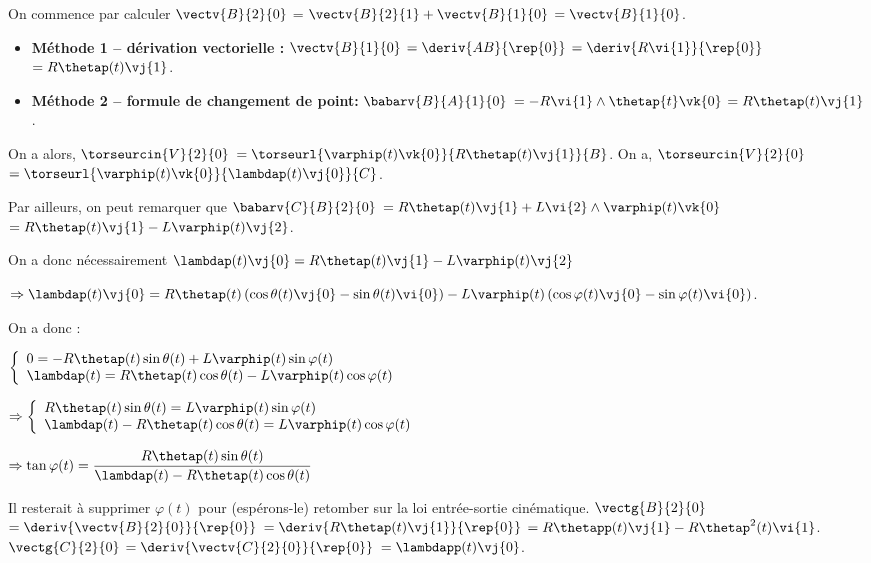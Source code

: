 \begin{corrigebox}
On commence par calculer $\vectv{B}{2}{0}$ = $\vectv{B}{2}{1}+\vectv{B}{1}{0}$ $=\vectv{B}{1}{0}$.
\begin{itemize}
\item \textbf{Méthode 1 -- dérivation vectorielle :}  $\vectv{B}{1}{0}$ $=\deriv{AB}{\rep{0}}$ 
$=\deriv{R\vi{1}}{\rep{0}}$ 
$= R\thetap(t) \vj{1}$. 
\item \textbf{Méthode 2 -- formule de changement de point: }
$\babarv{B}{A}{1}{0}$ 
$= -R\vi{1}\wedge \thetap{t} \vk{0}$
$= R\thetap(t) \vj{1}$.
\end{itemize}

On a alors, 
$\torseurcin{V}{2}{0}$
$=\torseurl{\varphip(t)\vk{0}}{R\thetap(t) \vj{1}}{B}$.
On a, 
$\torseurcin{V}{2}{0}$
$=\torseurl{\varphip(t)\vk{0}}{\lambdap(t) \vj{0}}{C}$.

Par ailleurs, on peut remarquer que 
$\babarv{C}{B}{2}{0}$
$= R\thetap(t) \vj{1} + L\vi{2}\wedge\varphip(t) \vk{0}$ 
$= R\thetap(t) \vj{1} - L\varphip(t)\vj{2}$.

On a donc nécessairement 
$\lambdap(t) \vj{0}= R\thetap(t) \vj{1} - L\varphip(t)\vj{2}$

$\Rightarrow \lambdap(t) \vj{0}= R\thetap(t) \left( \cos\theta(t)\vj{0}-\sin\theta(t)\vi{0} \right) - L\varphip(t)\left( \cos\varphi(t)\vj{0}-\sin\varphi(t)\vi{0}\right)$.

On a donc :

$
\left\{
\begin{array}{l}
0= -R\thetap(t) \sin\theta(t)  + L\varphip(t)\sin\varphi(t) \\
\lambdap(t) = R\thetap(t)  \cos\theta(t)- L\varphip(t)\cos\varphi(t)
\end{array}
\right.
$

$
\Rightarrow \left\{
\begin{array}{l}
R\thetap(t) \sin\theta(t)  = L\varphip(t)\sin\varphi(t) \\
\lambdap(t) - R\thetap(t)  \cos\theta(t)= L\varphip(t)\cos\varphi(t)
\end{array}
\right.
$

$\Rightarrow 
\tan \varphi(t) = \dfrac{R\thetap(t) \sin\theta(t) }{\lambdap(t) - R\thetap(t)  \cos\theta(t)}
$

Il resterait à supprimer $\varphi(t)$ pour (espérons-le) retomber sur la loi entrée-sortie cinématique.
$\vectg{B}{2}{0}$
$=\deriv{\vectv{B}{2}{0}}{\rep{0}}$
$=\deriv{R\thetap(t) \vj{1}}{\rep{0}}$
$=R\thetapp(t) \vj{1} - R\thetap^2(t) \vi{1}$.
$\vectg{C}{2}{0}$
$=\deriv{\vectv{C}{2}{0}}{\rep{0}}$
$=\lambdapp(t) \vj{0} $.
\end{corrigebox}

